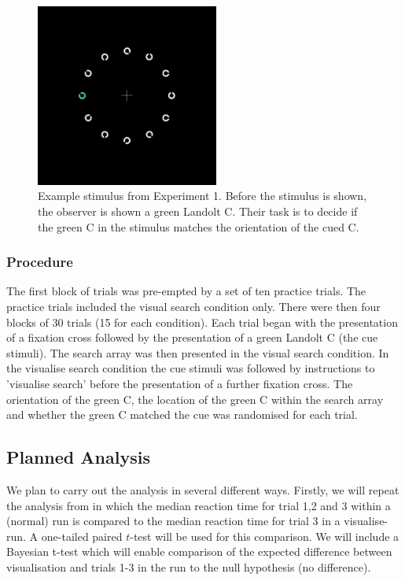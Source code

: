 \documentclass[smallextended]{svjour3}       %
\begin{document}
\begin{figure}
\centering
\includegraphics[width=6cm]{figs/exStimExp1.png}
\caption{Example stimulus from Experiment 1. Before the stimulus is shown, the observer is shown a green Landolt C. Their task is to decide if the green C in the stimulus matches the orientation of the cued C.}
\label{fig:exp1stimulus}
\end{figure}

\subsubsection{Procedure}
The first block of trials was pre-empted by a set of ten practice trials. The practice trials included the visual search condition only. There were then four blocks of 30 trials (15 for each condition). Each trial began with the presentation of a fixation cross followed by the presentation of a green Landolt C (the cue stimuli). The search array was then presented in the visual search condition. In the visualise search condition the cue stimuli was followed by instructions to 'visualise search' before the presentation of a further fixation cross. 
The orientation of the green C, the location of the green C within the search array and whether the green C matched the cue was randomised for each trial.

\subsection{Planned Analysis}

We plan to carry out the analysis in several different ways. Firstly, we will repeat the analysis from \cite{reinhart2015} in which the median reaction time for trial 1,2 and 3 within a (normal) run is compared to the median reaction time for trial 3 in a visualise-run. A one-tailed paired $t$-test will be used for this comparison. We will include a Bayesian t-test which will enable comparison of the expected difference between visualisation and trials 1-3 in the run to the null hypothesis (no difference).
\end{document}
